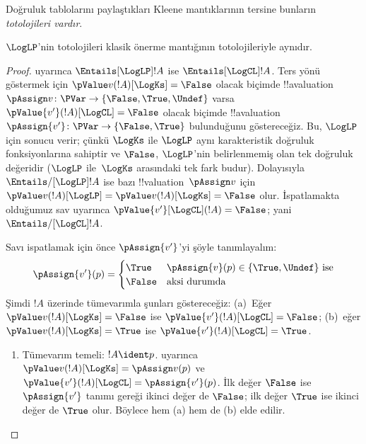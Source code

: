 Doğruluk tablolarını paylaştıkları Kleene mantıklarının tersine bunların
\emph{totolojileri vardır}.

\begin{prop} $\LogLP$'nin totolojileri klasik
  önerme mantığının totolojileriyle aynıdır.
\end{prop}

\begin{proof}
   uyarınca $\Entails[\LogLP] !A$ ise
  $\Entails[\LogCL] !A$. Ters yönü göstermek için
  $\pValue v(!A)[\LogKs] = \False$ olacak biçimde
  !!a{valuation}~$\pAssign v\colon \PVar \to \{\False, \True,
  \Undef\}$ varsa $\pValue {v'}(!A)[\LogCL] = \False$ olacak biçimde
  !!a{valuation}~$\pAssign {v'}\colon \PVar \to \{\False, \True\}$
  bulunduğunu göstereceğiz. Bu, $\LogLP$ için sonucu verir; çünkü $\LogKs$
  ile $\LogLP$ aynı karakteristik doğruluk fonksiyonlarına sahiptir ve
  $\False$, $\LogLP$'nin belirlenmemiş olan tek doğruluk değeridir
  ($\LogLP$ ile~$\LogKs$ arasındaki tek fark budur). Dolayısıyla
  $\Entails/[\LogLP] !A$ ise bazı !!{valuation}~$\pAssign v$ için
  $\pValue v(!A)[\LogLP] = \pValue v(!A)[\LogKs] = \False$ olur.
  İspatlamakta olduğumuz sav uyarınca
  $\pValue{v'}[\LogCL](!A) = \False$; yani
  $\Entails/[\LogCL] !A$.
  
  Savı ispatlamak için önce $\pAssign {v'}$'yi şöyle tanımlayalım:
  \[
    \pAssign {v'}(p) = 
    \begin{cases}
    \True & \text{$\pAssign {v}(p) \in \{\True, \Undef\}$ ise}\\
    \False & \text{aksi durumda}
  \end{cases}
  \]
  Şimdi $!A$ üzerinde tümevarımla şunları göstereceğiz: (a)~Eğer
  $\pValue v(!A)[\LogKs] = \False$ ise
  $\pValue {v'}(!A)[\LogCL] = \False$; (b)~eğer
  $\pValue v(!A)[\LogKs] = \True$ ise
  $\pValue {v'}(!A)[\LogCL] = \True$.
  \begin{enumerate}
    \item Tümevarım temeli: $!A \ident p$.
     uyarınca
    $\pValue v(!A)[\LogKs] = \pAssign v(p)$ ve
    $\pValue {v'}(!A)[\LogCL] = \pAssign {v'}(p)$. İlk değer $\False$ ise
    $\pAssign {v'}$ tanımı gereği ikinci değer de $\False$; ilk değer
    $\True$ ise ikinci değer de $\True$ olur. Böylece hem (a) hem de (b)
    elde edilir.
    

\end{enumerate}
\end{proof}

